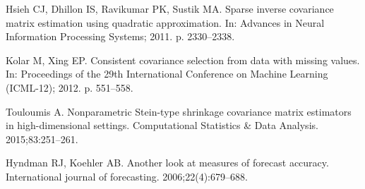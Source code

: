 \documentclass[10pt,letterpaper]{article}
\begin{document}
\begin{thebibliography}{10}
Hsieh CJ, Dhillon IS, Ravikumar PK, Sustik MA.
\newblock Sparse inverse covariance matrix estimation using quadratic
  approximation.
\newblock In: Advances in Neural Information Processing Systems; 2011. p.
  2330--2338.

Kolar M, Xing EP.
\newblock Consistent covariance selection from data with missing values.
\newblock In: Proceedings of the 29th International Conference on Machine
  Learning (ICML-12); 2012. p. 551--558.

Touloumis A.
\newblock Nonparametric Stein-type shrinkage covariance matrix estimators in
  high-dimensional settings.
\newblock Computational Statistics \& Data Analysis. 2015;83:251--261.

Hyndman RJ, Koehler AB.
\newblock Another look at measures of forecast accuracy.
\newblock International journal of forecasting. 2006;22(4):679--688.

\end{thebibliography}
\end{document}
